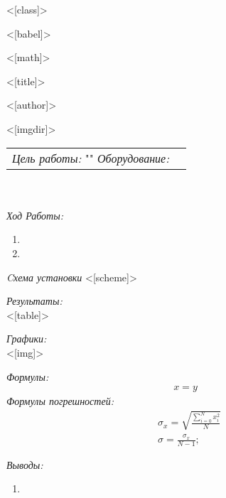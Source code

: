 
<[class]>
\usepackage[utf8]{inputenc}
<[babel]>
\usepackage[T2A]{fontenc}
<[math]>
\usepackage{graphicx}
\usepackage{float}
\usepackage[left=2cm,right=2cm,top=2cm,bottom=2cm]{geometry}

<[title]>

<[author]>

<[imgdir]>


\maketitle

\begin{tabular}{p{12cm} l}
\textit{Цель работы:\newline} "" \newline \newline
\textit{Оборудование:\newline}  
\end{tabular}\\ \\

\textit{Ход Работы:}
\begin{enumerate}
  \item 
  \item 
\end{enumerate}

\textit{Cхема установки}
<[scheme]>

\textit{Результаты:\\}
<[table]>

\textit{Графики:\\}
<[img]>

\textit{Формулы:}
\begin{align}
  x=y
\end{align}
\textit{Формулы погрешностей:}
\begin{align}
  & \sigma_x = \sqrt{\frac{\sum\limits_{i=0}^{N}x_i^2}{N}} \\
  & \sigma = \frac{\sigma_x}{N-1};%
\end{align}

\textit{Выводы:\\}
\begin{enumerate}
  \item 
\end{enumerate}


